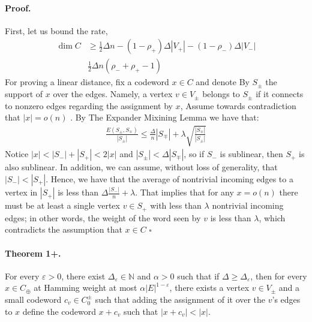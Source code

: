 \documentclass{article}
\begin{document}
\begin{multicols*}{2}
\paragraph{Proof.} First, let us bound the rate, 
\begin{equation*}
  \begin{split}
    \dim C & \ge \frac{1}{2}\Delta n - \left( 1 - \rho_{+} \right)\Delta|V_{+}| - \left( 1 - \rho_{-} \right)\Delta|V_{-}| \\
    & \frac{1}{2}\Delta n \left( \rho_{-} + \rho_{+}  - 1  \right) 
  \end{split}
\end{equation*}
For proving a linear distance, fix a codeword $x \in C$ and denote By $S_{\pm}$ the support of $x$ over the edges. Namely, a vertex $v\in V_{\pm}$ belongs to $S_{\pm}$ if it connects to nonzero edges regarding the assignment by $x$, Assume towards contradiction that $|x| = o\left( n \right)$ . By The Expander Mixining Lemma we have that: 
\begin{equation*}
  \begin{split}
    \frac{E\left( S_{\pm}, S_{\mp} \right)}{|S_{\pm}|}\le\frac{\Delta}{n}|S_{\mp}| + \lambda\sqrt{\frac{|S_{\mp}|}{|S_{\pm}|}}
  \end{split}
\end{equation*}
Notice $|x| < |S_{-}| + |S_{+}| < 2|x|$ and $|S_{\pm}| < \Delta |S_{\mp}|$, so if $S_{-}$ is sublinear, then $S_{+}$ is also sublinear. In addition, we can assume, without loss of generality, that $|S_{-}| < |S_{+}|$. Hence, we have that the average of nontrivial incoming edges to a vertex in $|S_{+}|$ is less than $ \Delta \frac{|S_{-}|}{n} + \lambda $. That implies that for any $x = o\left( n \right)$ there must be at least a single vertex $ v \in S_{+} $ with less than $ \lambda $ nontrivial incoming edges; in other words, the weight of the word seen by $v$ is less than $\lambda$, which contradicts the assumption that $x\in C$ $\square$

\paragraph{Theorem 1+.} For every $\varepsilon > 0$, there exist $\Delta_{\varepsilon}\in \mathbb{N}$ and $\alpha>0$ such that if $\Delta \ge \Delta_{\varepsilon}$, then for every $x \in C_{\oplus}$ at Hamming weight at most $\alpha |E|^{1-\varepsilon}$, there exists a vertex $v \in V_{\pm}$ and a small codeword $c_{v} \in C_{0}^{\pm} $ such that adding the assignment of it over the $v$'s edges to $x$ define the codeword $x + c_{v}$  such that $|x + c_{v}| < |x|$.  


\end{multicols*}
\end{document}

